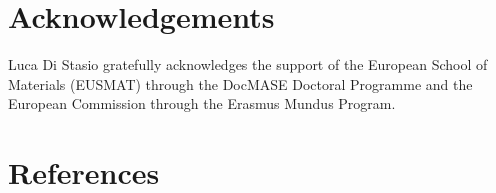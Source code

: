 
\section*{Acknowledgements}

Luca Di Stasio gratefully acknowledges the support of the European School of Materials (EUSMAT) through the DocMASE Doctoral Programme and the European Commission through the Erasmus Mundus Program.


\section*{References}
\printbibliography[heading=none]
